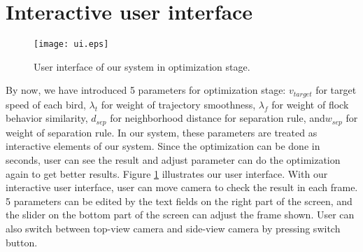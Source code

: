 \section{Interactive user interface}


\begin{figure}[h]
 \begin{center}
  \texttt{[image: ui.eps]}
 \end{center}
 \caption{User interface of our system in optimization stage.}
 \label{figure:ui}
\end{figure}


By now, we have introduced 5 parameters for optimization stage: $v_{target}$ for target speed of each bird, $\lambda_{t}$ for weight of trajectory smoothness, $\lambda_{f}$ for weight of flock behavior similarity, $d_{sep}$ for neighborhood distance for separation rule, and$w_{sep}$ for weight of separation rule. In our system, these parameters are treated as interactive elements of our system. Since the optimization can be done in seconds, user can see the result and adjust parameter can do the optimization again to get better results. Figure \ref{figure:ui} illustrates our user interface. With our interactive user interface, user can move camera to check the result in each frame. 5 parameters can be edited by the text fields on the right part of the screen, and the slider on the bottom part of the screen can adjust the frame shown. User can also switch between top-view camera and side-view camera by pressing switch button.